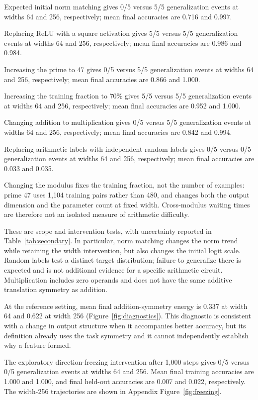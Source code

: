 Expected initial norm matching gives 0/5 versus 5/5 generalization events at widths 64 and 256, respectively; mean final accuracies are 0.716 and 0.997.

Replacing ReLU with a square activation gives 5/5 versus 5/5 generalization events at widths 64 and 256, respectively; mean final accuracies are 0.986 and 0.984.

Increasing the prime to 47 gives 0/5 versus 5/5 generalization events at widths 64 and 256, respectively; mean final accuracies are 0.866 and 1.000.

Increasing the training fraction to 70\% gives 5/5 versus 5/5 generalization events at widths 64 and 256, respectively; mean final accuracies are 0.952 and 1.000.

Changing addition to multiplication gives 0/5 versus 5/5 generalization events at widths 64 and 256, respectively; mean final accuracies are 0.842 and 0.994.

Replacing arithmetic labels with independent random labels gives 0/5 versus 0/5 generalization events at widths 64 and 256, respectively; mean final accuracies are 0.033 and 0.035.

Changing the modulus fixes the training fraction, not the number of examples: prime 47 uses 1,104 training pairs rather than 480, and changes both the output dimension and the parameter count at fixed width. Cross-modulus waiting times are therefore not an isolated measure of arithmetic difficulty.

These are scope and intervention tests, with uncertainty reported in Table~\ref{tab:secondary}. In particular, norm matching changes the norm trend while retaining the width intervention, but also changes the initial logit scale. Random labels test a distinct target distribution; failure to generalize there is expected and is not additional evidence for a specific arithmetic circuit. Multiplication includes zero operands and does not have the same additive translation symmetry as addition.

At the reference setting, mean final addition-symmetry energy is 0.337 at width 64 and 0.622 at width 256 (Figure~\ref{fig:diagnostics}). This diagnostic is consistent with a change in output structure when it accompanies better accuracy, but its definition already uses the task symmetry and it cannot independently establish why a feature formed.

The exploratory direction-freezing intervention after 1,000 steps gives 0/5 versus 0/5 generalization events at widths 64 and 256. Mean final training accuracies are 1.000 and 1.000, and final held-out accuracies are 0.007 and 0.022, respectively. The width-256 trajectories are shown in Appendix Figure~\ref{fig:freezing}.

